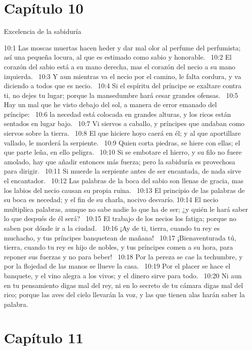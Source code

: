 \section*{Capítulo 10 }
Excelencia de la sabiduría  

10:1 Las moscas muertas hacen heder y dar mal olor al perfume del perfumista; así una pequeña locura, al que es estimado como sabio y honorable.  
10:2 El corazón del sabio está a su mano derecha, mas el corazón del necio a su mano izquierda.  
10:3 Y aun mientras va el necio por el camino, le falta cordura, y va diciendo a todos que es necio.  
10:4 Si el espíritu del príncipe se exaltare contra ti, no dejes tu lugar; porque la mansedumbre hará cesar grandes ofensas.  
10:5 Hay un mal que he visto debajo del sol, a manera de error emanado del príncipe:  
10:6 la necedad está colocada en grandes alturas, y los ricos están sentados en lugar bajo.  
10:7 Vi siervos a caballo, y príncipes que andaban como siervos sobre la tierra.  
10:8 El que hiciere hoyo caerá en él; y al que aportillare vallado, le morderá la serpiente.  
10:9 Quien corta piedras, se hiere con ellas; el que parte leña, en ello peligra.  
10:10 Si se embotare el hierro, y su filo no fuere amolado, hay que añadir entonces más fuerza; pero la sabiduría es provechosa para dirigir.  
10:11 Si muerde la serpiente antes de ser encantada, de nada sirve el encantador.  
10:12 Las palabras de la boca del sabio son llenas de gracia, mas los labios del necio causan su propia ruina.  
10:13 El principio de las palabras de su boca es necedad; y el fin de su charla, nocivo desvarío. 
10:14 El necio multiplica palabras, aunque no sabe nadie lo que ha de ser; ¿y quién le hará saber lo que después de él será?  
10:15 El trabajo de los necios los fatiga; porque no saben por dónde ir a la ciudad.  
10:16 ¡Ay de ti, tierra, cuando tu rey es muchacho, y tus príncipes banquetean de mañana!  
10:17 ¡Bienaventurada tú, tierra, cuando tu rey es hijo de nobles, y tus príncipes comen a su hora, para reponer sus fuerzas y no para beber!  
10:18 Por la pereza se cae la techumbre, y por la flojedad de las manos se llueve la casa.  
10:19 Por el placer se hace el banquete, y el vino alegra a los vivos; y el dinero sirve para todo.  
10:20 Ni aun en tu pensamiento digas mal del rey, ni en lo secreto de tu cámara digas mal del rico; porque las aves del cielo llevarán la voz, y las que tienen alas harán saber la palabra.  
\section*{Capítulo 11}

